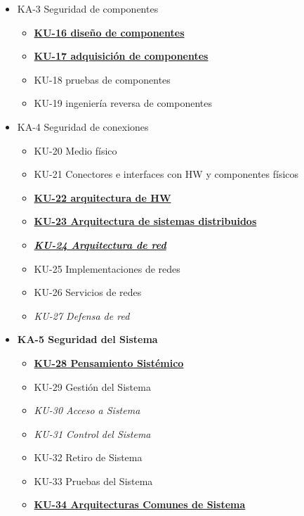 \begin{itemize}
\begin{itemize}
            
        \end{itemize}
    \item KA-3 Seguridad de componentes
    \begin{itemize}
            \item \underline{\textbf{KU-16 diseño de componentes}}
            \item \underline{\textbf{KU-17 adquisición de componentes}}
            \item KU-18 pruebas de componentes
            \item KU-19 ingeniería reversa de componentes
        \end{itemize}
    \item \color{black} KA-4 Seguridad de conexiones
    \begin{itemize}
            \item KU-20 Medio físico
            \item KU-21 Conectores e interfaces con HW y componentes físicos
            \item \underline{\textbf{KU-22 arquitectura de HW}}
            \item \underline{\textbf{KU-23 Arquitectura de sistemas distribuidos}}
            \item \underline{\textit{\textbf{KU-24 Arquitectura de red}}}
            \item KU-25 Implementaciones de redes
            \item KU-26 Servicios de redes
            \item \textit{KU-27 Defensa de red}
        \end{itemize}\color{black} 

    \item \textbf{ KA-5 Seguridad del Sistema}
    \begin{itemize}
    
        \item \underline{\textbf{KU-28 Pensamiento Sistémico}}
        \item KU-29 Gestión del Sistema
        \item \textit{KU-30 Acceso a Sistema }
        \item \textit{KU-31 Control del Sistema}
        \item KU-32 Retiro de Sistema
        \item KU-33 Pruebas del Sistema
       \item \underline{\textbf{ KU-34 Arquitecturas Comunes de Sistema}}
\end{itemize}


\end{itemize}
